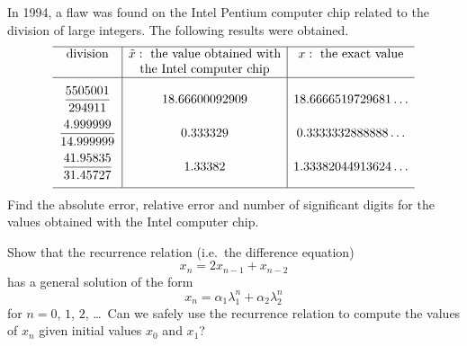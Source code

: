 \begin{question}
In 1994, a flaw was found on the Intel Pentium computer chip related
to the division of large integers.  The following results were
obtained.
\[
\begin{array}{c|c|c}
\hline
\text{division} & \tilde{x} : \text{ the value obtained with} &
x : \text{ the exact value} \\
& \text{the Intel computer chip} & \\
\hline
\rule[1em]{0em}{1em}
\DS \frac{5505001}{294911} & 18.66600092909 &
18.6666519729681\ldots \\[1em]
\DS \frac{4.999999}{14.999999} & 0.333329 & 0.3333332888888\ldots
\\[1em]
\DS \frac{41.95835}{31.45727} & 1.33382 &
1.33382044913624\ldots \\[1em]
\hline
\end{array}
\]
Find the absolute error, relative error and number of significant
digits for the values obtained with the Intel computer chip.
\end{question}


\begin{question}
Show that the recurrence relation (i.e.\ the difference equation)
\begin{equation}\label{finite_diff}
x_n = 2 x_{n-1} + x_{n-2}
\end{equation}
has a general solution of the form
\[
x_n = \alpha_1 \lambda_1^n + \alpha_2 \lambda_2^n
\]
for $n=0$, $1$, $2$, \ldots\  Can we safely use the recurrence relation
to compute the values of $x_n$ given initial values $x_0$ and $x_1$?
\end{question}

